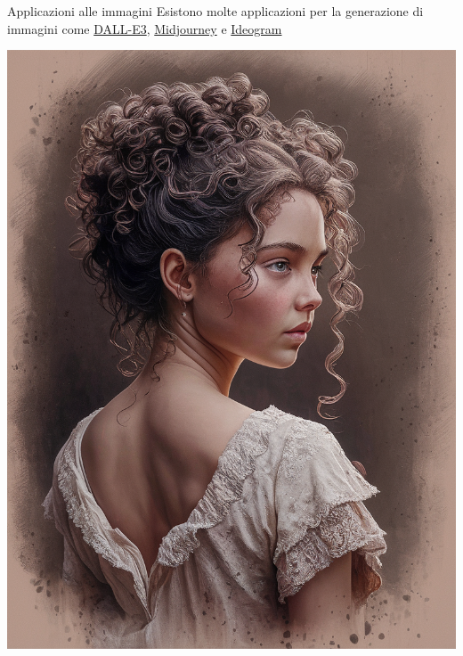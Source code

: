 \documentclass[aspectratio=169]{beamer}
\begin{document}
\begin{frame}{Applicazioni alle immagini}
    Esistono molte applicazioni per la generazione di immagini come \href{https://openai.com/index/dall-e-3/}{DALL-E3}, \href{https://www.midjourney.com/home}{Midjourney} e \href{https://ideogram.ai/t/top/1}{Ideogram}
        \begin{center}
            \begin{minipage}{0.23\textwidth}
                \includegraphics[height=0.7\textheight, width=\textwidth]{ideogram1.png}
            \end{minipage}%
            \hfill
            \begin{minipage}{0.23\textwidth}

\end{minipage}
\end{center}
\end{frame}
\end{document}
